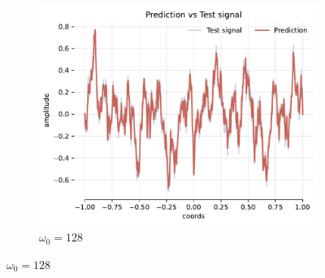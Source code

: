 \begin{figure}[h]
    \hfill
    \begin{subfigure}[b]{0.32\textwidth}
        \centering
        \includegraphics[width=\textwidth]{img/ch3/pred-noise-h0-w128.pdf}
        \caption{$\omega_0=128$}
        \label{fig:rec-noise-shallow-w128}
    \end{subfigure}


\end{figure}
